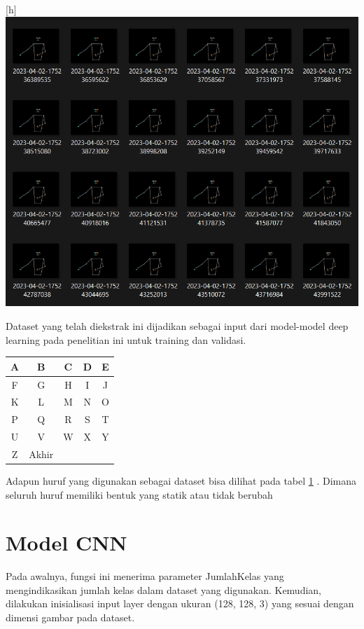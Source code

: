 \begin{center}[h]
	\includegraphics[width=0.7\linewidth]{gambar/tugas-akhir-dawe.png}
	\label{fig:Datasetekstark}
\end{center}
Dataset yang telah diekstrak ini dijadikan sebagai input dari model-model deep learning pada penelitian ini untuk training dan validasi. 

\begin{table}[htbp]
	\centering
	\label{tab:datasethuruf}
	\begin{tabular}{|c|c|c|c|c|}
		\hline
		A & B & C & D & E \\
		\hline
		F & G & H & I & J \\
		\hline
		K & L & M & N & O \\
		\hline
		P & Q & R & S & T \\
		\hline
		U & V & W & X & Y \\
		\hline
		Z &   Akhir &   &   &   \\
		\hline
	\end{tabular}
\end{table}

Adapun huruf yang digunakan sebagai dataset bisa dilihat pada tabel \ref{tab:datasethuruf} . Dimana seluruh huruf memiliki bentuk yang statik atau tidak berubah

\section{Model CNN}

Pada awalnya, fungsi ini menerima parameter JumlahKelas yang mengindikasikan jumlah kelas dalam dataset yang digunakan. Kemudian, dilakukan inisialisasi input layer dengan ukuran (128, 128, 3) yang sesuai dengan dimensi gambar pada dataset.

